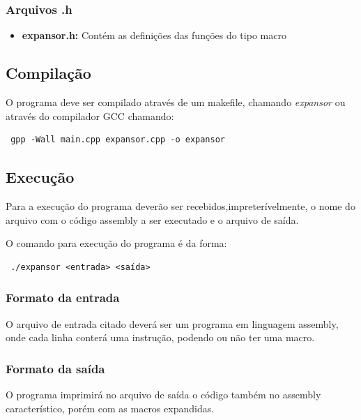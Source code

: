 \documentclass[12pt]{article}
\begin{document}
\subsubsection{Arquivos .h}

\begin{itemize}
\item \textbf{expansor.h:} Contém as definições das funções do tipo macro
\end{itemize}

\subsection{Compilação}

O programa deve ser compilado através de um makefile, chamando
\textit{expansor}
ou através do compilador GCC chamando:\\

\begin{footnotesize}
\begin{verbatim} gpp -Wall main.cpp expansor.cpp -o expansor \end{verbatim}
\end{footnotesize}

\subsection{Execução}

Para a execução do programa deverão ser recebidos,impreterívelmente, o nome do 
arquivo com o código assembly a ser executado e o arquivo de saída. 

O comando para execução do programa é da forma: \\

\begin{footnotesize}
\begin{verbatim} ./expansor <entrada> <saída> \end{verbatim}
\end{footnotesize}

\subsubsection{Formato da entrada}
O arquivo de entrada citado deverá ser um programa em linguagem assembly,
onde cada linha conterá uma instrução, podendo ou não ter uma macro.

\subsubsection{Formato da saída}
O programa imprimirá no arquivo de saída o código também no assembly
característico, porém com as macros expandidas.
\end{document}
